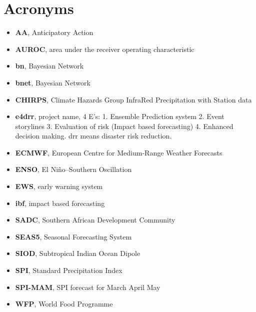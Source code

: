 \documentclass{article}
\begin{document}
\section*{Acronyms}
\begin{itemize}
\item {\bf AA}, Anticipatory Action
\item {\bf AUROC}, area under the receiver operating characteristic
\item {\bf bn}, Bayesian Network
\item {\bf bnet}, Bayesian Network
\item {\bf CHIRPS}, Climate Hazards Group InfraRed Precipitation with Station data
\item {\bf e4drr}, project name, 4 E's: 1. Ensemble Prediction system 2. Event storylines 3. Evaluation of risk (Impact based forecasting) 4. Enhanced decision making. drr means disaster risk reduction.
\item {\bf ECMWF}, European Centre for Medium-Range Weather Forecasts
\item {\bf ENSO}, El Niño–Southern Oscillation
\item {\bf EWS}, early warning system
\item {\bf ibf}, impact based forecasting
\item {\bf SADC}, Southern African Development Community
\item {\bf SEAS5}, Seasonal Forecasting System
\item {\bf SIOD}, Subtropical Indian Ocean Dipole
\item {\bf SPI}, Standard Precipitation Index
\item {\bf SPI-MAM}, SPI forecast for  March April May
\item {\bf WFP}, World Food Programme
\end{itemize}
\end{document}
